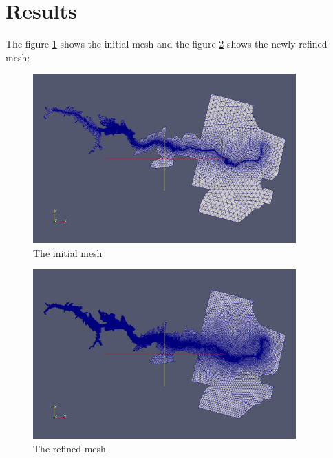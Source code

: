 \section{Results}
The figure \ref{fig:refinement:inimesh} shows the initial mesh
and the figure \ref{fig:refinement:newmesh} shows the newly refined mesh:
\begin{figure}[H]%
\begin{center}
%
  \includegraphics[width=0.9\textwidth]{inimesh}
%
\end{center}
\caption
{The initial mesh}
\label{fig:refinement:inimesh}
\end{figure}
%
\begin{figure}[H]%
\begin{center}
%
  \includegraphics[width=0.9\textwidth]{newmesh}
%
\end{center}
\caption
{The refined mesh}
\label{fig:refinement:newmesh}
\end{figure}
%
